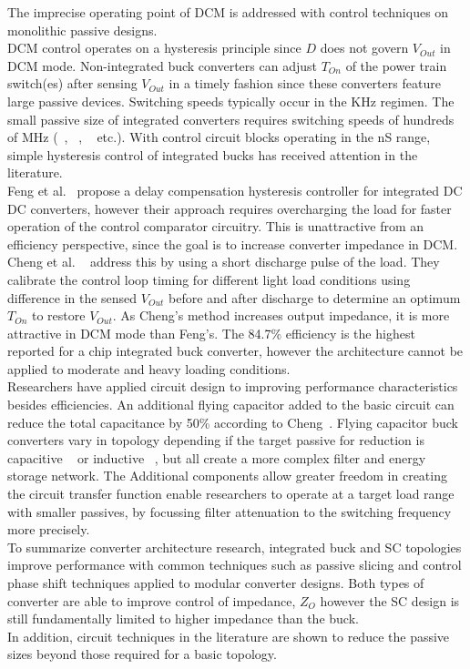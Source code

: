 \documentclass[letterpaper,twocolumn,10pt]{article}
\begin{document}
\indent The imprecise operating point of DCM is addressed with control techniques on monolithic passive designs.\\
DCM control operates on a hysteresis principle since $D$ does not govern $V_{Out}$ in DCM mode. Non-integrated buck converters can adjust $T_{On}$ of the power train switch(es) after sensing $V_{Out}$ in a timely fashion since these converters feature large passive devices. Switching speeds typically occur in the KHz regimen. The small passive size of integrated converters requires switching speeds of hundreds of MHz (~\cite{Alimadadi2008}, ~\cite{Bathily2012}, ~\cite{Sturcken2013} etc.). With control circuit blocks operating in the nS range, simple hysteresis control of integrated bucks has received attention in the literature.\\
Feng et al.~\cite{Feng2008} propose a delay compensation hysteresis controller for integrated DC DC converters, however their approach requires overcharging the load for faster operation of the control comparator circuitry. This is unattractive from an efficiency perspective, since the goal is to increase converter impedance in DCM. Cheng et al. ~\cite{Cheng2013} address this by using a short discharge pulse of the load. They calibrate the control loop timing for different light load conditions using difference in the sensed $V_{Out}$ before and after discharge to determine an optimum $T_{On}$ to restore $V_{Out}$. As Cheng's method increases output impedance, it is more attractive in DCM mode than Feng's. The 84.7\% efficiency is the highest reported for a chip integrated buck converter, however the architecture cannot be applied to moderate and heavy loading conditions.\\  
\indent Researchers have applied circuit design to improving performance characteristics besides efficiencies. An additional flying capacitor added to the basic circuit can reduce the total capacitance by 50\% according to Cheng~\cite{ChengII2013}. Flying capacitor buck converters vary in topology depending if the target passive for reduction is capacitive ~\cite{ChengII2013} or inductive ~\cite{Kim2011}, but all create a more complex filter and energy storage network. The Additional components allow greater freedom in creating the circuit transfer function enable researchers to operate at a target load range with smaller passives, by focussing filter attenuation to the switching frequency more precisely.\\

To summarize converter architecture research, integrated buck and SC topologies improve performance with common techniques such as passive slicing and control phase shift techniques applied to modular converter designs. Both types of converter are able to improve control of impedance, $Z_O$ however the SC design is still fundamentally limited to higher impedance than the buck.\\
In addition, circuit techniques in the literature are shown to reduce the passive sizes beyond those required for a basic topology.\\  
 
\end{document}
